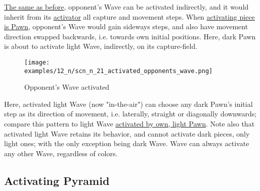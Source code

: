 \vspace*{-0.5\baselineskip}
\hyperref[fig:scn_mv_78_activating_opponents_wave]{The same as before},
opponent's Wave can be activated indirectly, and it would inherit from its
\hyperref[sec:Terms/Activator]{activator} all capture and movement steps. When
\hyperref[fig:scn_n_18_capture_pawn_init]{activating piece is Pawn}, opponent's
Wave would gain sideways steps, and also have movement direction swapped backwards,
i.e. towards own initial positions.\newline
\indent
Here, dark Pawn is about to activate light Wave, indirectly, on its capture-field.

\clearpage %

\vspace*{-2.1\baselineskip}
\noindent
\begin{figure}[!h]
\texttt{[image: examples/12\_n/scn\_n\_21\_activated\_opponents\_wave.png]}
\vspace*{-1.4\baselineskip}
\caption{Opponent's Wave activated}
\label{fig:scn_n_21_activated_opponents_wave}
\end{figure}

\vspace*{-0.5\baselineskip}
Here, activated light Wave (now "in-the-air") can choose any dark Pawn's initial
step as its direction of movement, i.e. laterally, straight or diagonally downwards;
compare this pattern to light Wave
\hyperref[fig:scn_n_19_capture_pawn_activated_wave]{activated by own, light Pawn}.\newline
\indent
Note also that activated light Wave retains its behavior, and cannot activate dark
pieces, only light ones; with the only exception being dark Wave. Wave can always
activate any other Wave, regardless of colors.

\clearpage %

\subsection*{Activating Pyramid}
\label{sec:Nineteen/Sideways Pawns/Activating Pyramid}

